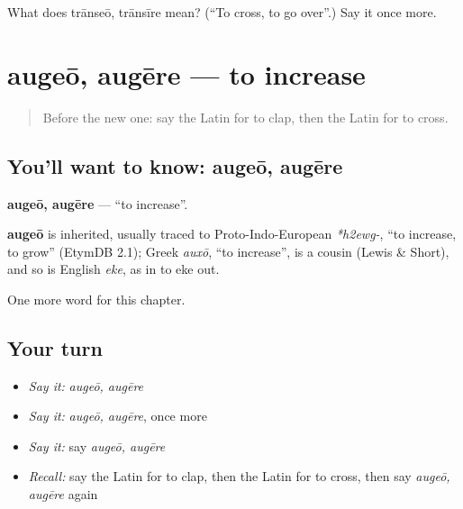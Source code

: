 \begin{tcolorbox}[breakable,colback=teal!4,colframe=teal!35!black,title={Before you move on}]
What does trānseō, trānsīre mean? (\textquotedblleft{}To cross, to go over\textquotedblright{}.) Say it once more.
\end{tcolorbox}
\section[augeō, augēre]{augeō, augēre — to increase}

\label{lesson:LA-C256-augeo}



\begin{quote}
Before the new one: say the Latin for to clap, then the Latin for to cross.
\end{quote}

\subsection*{You'll want to know: augeō, augēre}
\textbf{augeō, augēre} — \textquotedblleft{}to increase\textquotedblright{}.

\begin{cousinweb}
\textbf{augeō} is inherited, usually traced to Proto-Indo-European \emph{*h2ewg-}, \textquotedblleft{}to increase, to grow\textquotedblright{} (EtymDB 2.1); Greek \emph{auxō}, \textquotedblleft{}to increase\textquotedblright{}, is a cousin (Lewis \& Short), and so is English \emph{eke}, as in to eke out.
\end{cousinweb}

\begin{grammarlens}[title={What you've built}]
One more word for this chapter.
\end{grammarlens}

\subsection*{Your turn}
\begin{itemize}
\raggedright
  \item \emph{Say it:} \emph{augeō, augēre}
  \item \emph{Say it:} \emph{augeō, augēre}, once more
  \item \emph{Say it:} say \emph{augeō, augēre}
  \item \emph{Recall:} say the Latin for to clap, then the Latin for to cross, then say \emph{augeō, augēre} again
\end{itemize}

